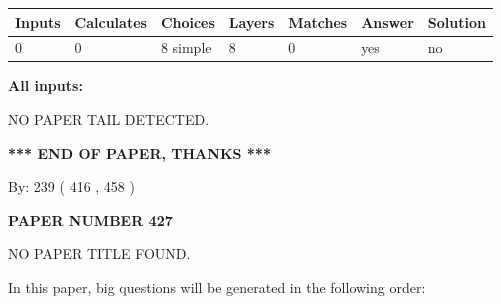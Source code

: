 \documentclass[12pt]{article}
\begin{document}
 
\noindent{}
 
 
   
   
   
   
\noindent\begin{tabular}{|l|l|l|l|l|l|l|}
 \hline
Inputs & Calculates & Choices & Layers & Matches & Answer & Solution \\ \hline
 0  & 
 0  & 
 8
  simple  
  & 
 8  & 
 0  & 
  yes & 
  no 
  \\ \hline
 \end{tabular}
   
   
   
   
\noindent{}
   
   
   
   
\noindent\vspace{0.1in}\hspace{-0.08in} {\textbf{\Large{All inputs: }}}
   
   
   
   
\vspace{2.0in} NO PAPER TAIL DETECTED.
   
   
   
   
\vspace{1.0in} 
{\textbf{\large{ *** END OF PAPER, THANKS *** }}} 
   
   
\hspace{1.0in} By: 
 239 ( 416 ,  458 )
   
   
   
   
\newpage 
\setcounter{page}{ 
   427001 } 
   
   
   
   
 {\textbf{ \Large{ PAPER NUMBER  427  }}}
   
   
\vspace{0.2in}
   
   
   
   
   
   
 NO PAPER TITLE FOUND.
   
   
   
\vspace{0.2in}
   
In this paper, big questions will be generated in the following order: 
   
\end{document}

